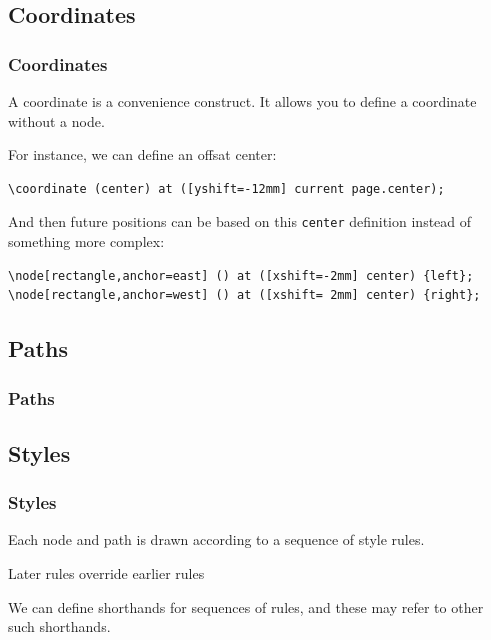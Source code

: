 \subsection{Coordinates}
\begin{frame}[fragile]
  \frametitle{Coordinates}
  \vspace{3mm}
  A coordinate is a convenience construct. It allows you to define a coordinate without a node.
  
  \pause
  \vspace{5mm}
  For instance, we can define an offsat center:
  \begin{verbatim}
\coordinate (center) at ([yshift=-12mm] current page.center);
  \end{verbatim}
  
  \pause
  \vspace{5mm}
  And then future positions can be based on this \texttt{center} definition instead of something more complex:
  \begin{verbatim}
\node[rectangle,anchor=east] () at ([xshift=-2mm] center) {left};
\node[rectangle,anchor=west] () at ([xshift= 2mm] center) {right};
  \end{verbatim}
\end{frame}

\subsection{Paths}
\begin{frame}[fragile]
  \frametitle{Paths}
  \vspace{3mm}
  
\end{frame}

\subsection{Styles}
\begin{frame}[fragile]
  \frametitle{Styles}
  \vspace{3mm}
  Each node and path is drawn according to a sequence of style rules.
  
  \vspace{5mm}
  Later rules override earlier rules
  
  \vspace{5mm}
  We can define shorthands for sequences of rules, and these may refer to other such shorthands.
  
\end{frame}

